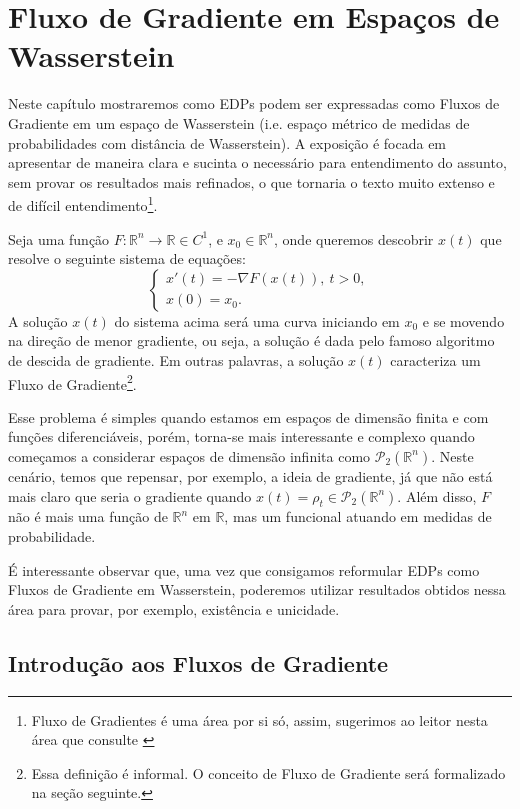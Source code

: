\newpage
\chapter{Fluxo de Gradiente em Espaços de Wasserstein}

Neste capítulo mostraremos como EDPs podem ser expressadas como
Fluxos de Gradiente em um espaço de Wasserstein
(i.e. espaço métrico de medidas de probabilidades com distância de Wasserstein). A exposição é
focada em apresentar de maneira clara e sucinta o necessário para entendimento
do assunto, sem provar os resultados mais refinados, o que tornaria o
texto muito extenso e de difícil entendimento\footnote{Fluxo de Gradientes é uma área por si só, assim, sugerimos ao leitor nesta área
que consulte \citet{ambrosio2008gradient}}.

Seja uma função $F:\mathbb R^n \to \mathbb R \in C^1$, e $x_0 \in \mathbb R^n$,
onde queremos descobrir $x(t)$ que resolve o seguinte sistema de equações:
\begin{equation}
    \begin{cases}
        x'(t) = -\nabla F(x(t)), \ t>0,\\
        x(0)  = x_0.
    \end{cases}
\end{equation}
A solução $x(t)$ do sistema acima será uma curva iniciando em $x_0$ e se movendo
na direção de menor gradiente, ou seja, a solução é dada
pelo famoso algoritmo de descida de gradiente. Em outras palavras,
a solução $x(t)$ caracteriza um Fluxo de Gradiente\footnote{Essa definição é informal. O conceito
de Fluxo de Gradiente será formalizado na seção seguinte.}.

Esse problema é simples quando estamos em espaços de dimensão finita e com
funções diferenciáveis, porém, torna-se mais
interessante e complexo quando começamos a considerar espaços de dimensão infinita
como $\mathcal P_2(\mathbb R^n)$. Neste cenário, temos que repensar, por exemplo,
a ideia de gradiente, já que não está mais claro que seria o gradiente quando
$x(t) = \rho_t \in \mathcal P_2(\mathbb R^n)$. Além disso, $F$ não é mais uma
função de $\mathbb R^n$ em $\mathbb R$, mas um funcional atuando em medidas
de probabilidade.

É interessante observar que, uma vez que consigamos reformular EDPs
como Fluxos de Gradiente em Wasserstein, poderemos utilizar resultados
obtidos nessa área para provar, por exemplo, existência e unicidade.

\section{Introdução aos Fluxos de Gradiente}

